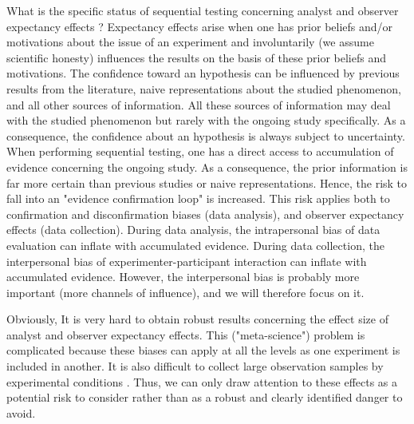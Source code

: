 \documentclass[a4paper,man,natbib,floatsintext,donotrepeattitle]{apa6}
\begin{document}
What is the specific status of sequential testing concerning analyst and observer expectancy effects ? Expectancy effects arise when one has prior beliefs and/or motivations about the issue of an experiment and involuntarily (we assume scientific honesty) influences the results on the basis of these prior beliefs and motivations. The confidence toward an hypothesis can be influenced by previous results from the literature, naive representations about the studied phenomenon, and all other sources of information. All these sources of information may deal with the studied phenomenon but rarely with the ongoing study specifically. As a consequence, the confidence about an hypothesis is always subject to uncertainty. When performing sequential testing, one has a direct access to accumulation of evidence concerning the ongoing study. As a consequence, the prior information is far more certain than previous studies or naive representations. Hence, the risk to fall into an "evidence confirmation loop" is increased. This risk applies both to confirmation and disconfirmation biases (data analysis), and observer expectancy effects (data collection). During data analysis, the intrapersonal bias of data evaluation can inflate with accumulated evidence. During data collection, the interpersonal bias of experimenter-participant interaction can inflate with accumulated evidence. However, the interpersonal bias is probably more important (more channels of influence), and we will therefore focus on it. \par


Obviously, It is very hard to obtain robust results concerning the effect size of analyst and observer expectancy effects. This ("meta-science") problem is complicated because these biases can apply at all the levels as one experiment is included in another. It is also difficult to collect large observation samples by experimental conditions \citep[e.g.,][]{zoble_interaction_1969}. Thus, we can only draw attention to these effects as a potential risk to consider rather than as a robust and clearly identified danger to avoid. \par
\end{document}
